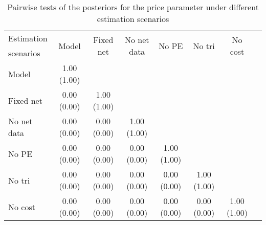
    \begin{table}[!h]
    \caption{Pairwise tests of the posteriors for the price parameter under different estimation scenarios}
    \label{table:ctrf-posteriorPrice-tests}
    \begin{center}
    \begin{tabular}{lccccccc}
    Estimation & \multirow{2}{*}{Model} & \multirow{2}{*}{Fixed net}&\multirow{2}{*}{No net data}&\multirow{2}{*}{No PE}&\multirow{2}{*}{No tri}&\multirow{2}{*}{No cost} \\
    scenarios &  \\ \hline \hline
    Model        & 1.00 (1.00) \\ 
Fixed net    & 0.00 (0.00) & 1.00 (1.00) \\ 
No net data  & 0.00 (0.00) & 0.00 (0.00) & 1.00 (1.00) \\ 
No PE        & 0.00 (0.00) & 0.00 (0.00) & 0.00 (0.00) & 1.00 (1.00) \\ 
No tri       & 0.00 (0.00) & 0.00 (0.00) & 0.00 (0.00) & 0.00 (0.00) & 1.00 (1.00) \\ 
No cost      & 0.00 (0.00) & 0.00 (0.00) & 0.00 (0.00) & 0.00 (0.00) & 0.00 (0.00) & 1.00 (1.00) \\ 

    \hline
    \end{tabular}
    \end{center}
     
    \end{table}
    